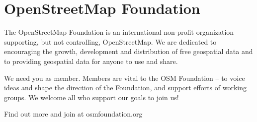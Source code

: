 \newpage
\section*{OpenStreetMap Foundation}
\label{osmf}
The OpenStreetMap Foundation is an
international non-profit organization
supporting, but not controlling,
OpenStreetMap. We are dedicated to
encouraging the growth, development and
distribution of free geospatial data and to
providing geospatial data for anyone to use
and share.

We need you as member. Members are vital
to the OSM Foundation -- to voice ideas
and shape the direction of the Foundation,
and support efforts of working groups. We
welcome all who support our goals to join us!

Find out more and join at osmfoundation.org

